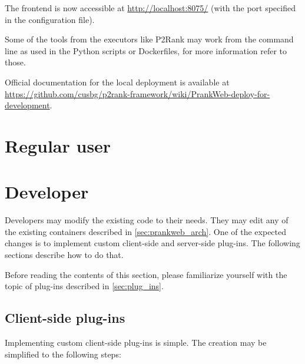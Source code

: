 The frontend is now accessible at \url{http://localhost:8075/} (with the port specified in the configuration file).

Some of the tools from the executors like P2Rank may work from the command line as used in the Python scripts or Dockerfiles, for more information refer to those.

Official documentation for the local deployment is available at \url{https://github.com/cusbg/p2rank-framework/wiki/PrankWeb-deploy-for-development}.


\section{Regular user}
\label{sec:regular_user}

\section{Developer}
\label{sec:developer}

Developers may modify the existing code to their needs. They may edit any of the existing containers described in \cref{sec:prankweb_arch}. One of the expected changes is to implement custom client-side and server-side plug-ins. The following sections describe how to do that.

Before reading the contents of this section, please familiarize yourself with the topic of plug-ins described in \cref{sec:plug_ins}.

\subsection{Client-side plug-ins}
\label{subsec:dev_client_side}

Implementing custom client-side plug-ins is simple. The creation may be simplified to the following steps:

